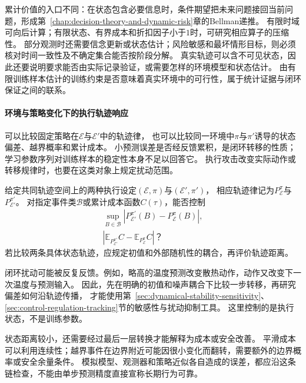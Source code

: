 累计价值的入口不同：在状态包含必要信息时，条件期望把未来问题接回当前问题，形成第~\ref{chap:decision-theory-and-dynamic-risk}章的Bellman递推。
有限时域可向后计算；有限状态、有界成本和折扣因子小于$1$时，可研究相应算子的压缩性。
部分观测时还需要信念更新或状态估计；风险敏感和最坏情形目标，则必须核对时间一致性及不确定集合能否按阶段分解。
真实轨迹可以含不可见状态，因此还要说明要求能否由实际记录验证，或需要怎样的环境模型和状态估计。
由有限训练样本估计的训练约束是否意味着真实环境中的可行性，属于统计证据与闭环保证之间的联系。

\paragraph{环境与策略变化下的执行轨迹响应}
\label{sec:future-analysis-trajectory-perturbation}

可以比较固定策略在$\mathcal E$与$\mathcal E'$中的轨迹律，
也可以比较同一环境中$\pi$与$\pi'$诱导的状态偏差、越界概率和累计成本。
小预测误差是否经反馈累积，是闭环转移的性质；
学习参数序列对训练样本的稳定性本身不足以回答它。
执行攻击改变实际动作或转移规律时，也要在这类对象上规定扰动范围。

\begin{mathproblem}[闭环过程对环境与策略变化的响应]
  \label{question:future-trajectory-perturbation}
  给定共同轨迹空间上的两种执行设定$(\mathcal E,\pi)$与$(\mathcal E',\pi')$，
  相应轨迹律记为$P_{\mathcal E}^{\pi}$与$P_{\mathcal E'}^{\pi'}$。
  对指定事件类$\mathcal B$或累计成本函数$C(\tau)$，能否控制
  \[
    \begin{gathered}
      \sup_{B\in\mathcal B}
        |P_{\mathcal E'}^{\pi'}(B)-P_{\mathcal E}^{\pi}(B)|,\\
      |\mathbb E_{P_{\mathcal E'}^{\pi'}}C
       -\mathbb E_{P_{\mathcal E}^{\pi}}C|\text{？}
    \end{gathered}
  \]
  若比较两条具体状态轨迹，应规定初值和外部随机性的耦合，再评价轨迹距离。
\end{mathproblem}

闭环扰动可能被反复反馈。例如，略高的温度预测改变散热动作，动作又改变下一次温度与预测输入。
因此，先在明确的初值和噪声耦合下比较一步转移，再研究偏差如何沿轨迹传播，
才能使用第~\ref{sec:dynamical-stability-sensitivity}、\ref{sec:control-regulation-tracking}节的敏感性与扰动抑制工具。
这里控制的是执行状态，不是训练参数。

状态距离较小，还需要经过最后一层转换才能解释为成本或安全改善。
平滑成本可以利用连续性；越界事件在边界附近可能因很小变化而翻转，需要额外的边界概率或安全余量条件。
模拟模型、观测器和策略近似各自造成的误差，都应沿这条链检查，不能由单步预测精度直接宣称长期行为可靠。

